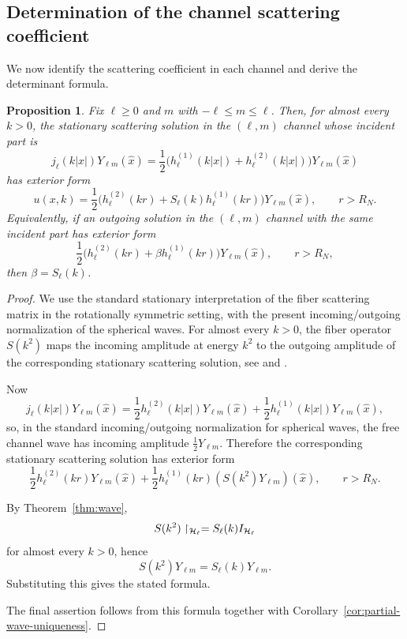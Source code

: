 \documentclass[a4paper,11pt]{article}
\numberwithin{equation}{section}
\newtheorem{prop}[thm]{Proposition}
\theoremstyle{definition}
\theoremstyle{remark}
\begin{document}
\subsection{Determination of the channel scattering coefficient}
We now identify the scattering coefficient in each channel and derive the determinant formula.

\begin{prop}
\label{prop:stationary-channel}
Fix $\ell \ge 0$ and $m$ with $-\ell \le m \le \ell$. Then, for almost every
$k>0$, the stationary scattering solution in the $(\ell,m)$ channel whose
incident part is
\[
j_\ell(k|x|)Y_{\ell m}(\widehat x)
=
\frac12\bigl(h_\ell^{(1)}(k|x|)+h_\ell^{(2)}(k|x|)\bigr)Y_{\ell m}(\widehat x)
\]
has exterior form
\begin{equation}\label{eq:stationary-channel}
u(x,k)=
\frac12\bigl(h_\ell^{(2)}(kr)+S_\ell(k)h_\ell^{(1)}(kr)\bigr)Y_{\ell m}(\widehat x),
\qquad r>R_N.
\end{equation}
Equivalently, if an outgoing solution in the $(\ell,m)$ channel with the same
incident part has exterior form
\[
\frac12\bigl(h_\ell^{(2)}(kr)+\beta h_\ell^{(1)}(kr)\bigr)Y_{\ell m}(\widehat x),
\qquad r>R_N,
\]
then $\beta=S_\ell(k)$.
\end{prop}

\begin{proof}
We use the standard stationary interpretation of the fiber scattering matrix
in the rotationally symmetric setting, with the present incoming/outgoing
normalization of the spherical waves.
For almost every $k>0$, the fiber operator $S(k^2)$ maps the incoming
amplitude at energy $k^2$ to the outgoing amplitude of the corresponding
stationary scattering solution, see
\cite[Ch.~XI, Sects.~8A--C]{ReedSimonIII} and \cite{Yafaev1992}.

Now
\[
j_\ell(k|x|)Y_{\ell m}(\widehat x)
=
\frac12 h_\ell^{(2)}(k|x|)Y_{\ell m}(\widehat x)
+
\frac12 h_\ell^{(1)}(k|x|)Y_{\ell m}(\widehat x),
\]
so, in the standard incoming/outgoing normalization for spherical waves, the
free channel wave has incoming amplitude $\frac12 Y_{\ell m}$.
Therefore the corresponding stationary scattering solution has exterior form
\[
\frac12 h_\ell^{(2)}(kr)Y_{\ell m}(\widehat x)
+
\frac12 h_\ell^{(1)}(kr)(S(k^2)Y_{\ell m})(\widehat x),
\qquad r>R_N.
\]

By Theorem~\ref{thm:wave},
\[
S(k^2)\upharpoonright_{{\cal H}_\ell}=S_\ell(k)I_{{\cal H}_\ell}
\]
for almost every $k>0$, hence
\[
S(k^2)Y_{\ell m}=S_\ell(k)Y_{\ell m}.
\]
Substituting this gives the stated formula.

The final assertion follows from this formula together with
Corollary~\ref{cor:partial-wave-uniqueness}.
\end{proof}
\end{document}
